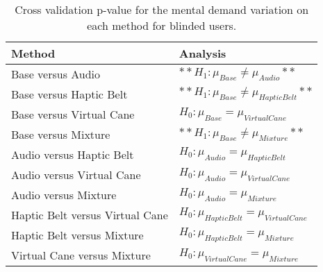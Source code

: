 
\begin{table}[!htb]
\centering
\caption{Cross validation p-value for the mental demand variation on each method for blinded users.}
\label{tab:lsd_mental_demand_var}
\begin{tabular}{ll}
\toprule
                         Method &                                      Analysis \\
\midrule
              Base versus Audio &             $**H_{1} : \mu_{Base} \ne \mu_{Audio}**$ \\
        Base versus Haptic Belt &       $**H_{1} : \mu_{Base} \ne \mu_{Haptic Belt}**$ \\
       Base versus Virtual Cane &        $H_{0} : \mu_{Base} = \mu_{Virtual Cane}$ \\
            Base versus Mixture &           $**H_{1} : \mu_{Base} \ne \mu_{Mixture}**$ \\
       Audio versus Haptic Belt &        $H_{0} : \mu_{Audio} = \mu_{Haptic Belt}$ \\
      Audio versus Virtual Cane &       $H_{0} : \mu_{Audio} = \mu_{Virtual Cane}$ \\
           Audio versus Mixture &            $H_{0} : \mu_{Audio} = \mu_{Mixture}$ \\
Haptic Belt versus Virtual Cane & $H_{0} : \mu_{Haptic Belt} = \mu_{Virtual Cane}$ \\
     Haptic Belt versus Mixture &      $H_{0} : \mu_{Haptic Belt} = \mu_{Mixture}$ \\
    Virtual Cane versus Mixture &     $H_{0} : \mu_{Virtual Cane} = \mu_{Mixture}$ \\
\bottomrule
\end{tabular}
\end{table}

